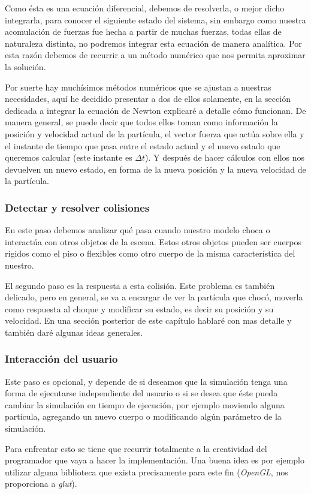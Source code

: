 Como ésta es una ecuación diferencial, debemos de resolverla, o mejor dicho integrarla, para conocer el siguiente estado del sistema, sin embargo como nuestra acomulación de fuerzas fue hecha a partir de muchas fuerzas, todas ellas de naturaleza distinta, no podremos integrar esta ecuación de manera analítica. Por esta razón debemos de recurrir a un método numérico que nos permita aproximar la solución.

Por suerte hay muchísimos métodos numéricos que se ajustan a nuestras necesidades, aquí he decidido presentar a dos de ellos solamente, en la sección dedicada a integrar la ecuación de Newton explicaré a detalle cómo funcionan. De manera general, se puede decir que todos ellos toman como información la posición y velocidad actual de la partícula, el vector fuerza que actúa sobre ella y el instante de tiempo que pasa entre el estado actual y el nuevo estado que queremos calcular (este instante es $\Delta t$). Y después de hacer cálculos con ellos nos devuelven un nuevo estado, en forma de la nueva posición y la nueva velocidad de la partícula.

\subsubsection{Detectar y resolver colisiones}
En este paso debemos analizar qué pasa cuando nuestro modelo choca o interactúa con otros objetos de la escena. Estos otros objetos pueden ser cuerpos rígidos como el piso o flexibles como otro cuerpo de la misma característica del nuestro.

El segundo paso es la respuesta a esta colisión. Este problema es también delicado, pero en general, se va a encargar de ver la partícula que chocó, moverla como respuesta al choque y modificar su estado, es decir su posición y su velocidad. En una sección posterior de este capítulo hablaré con mas detalle y también daré algunas ideas generales.

\subsubsection{Interacción del usuario}
Este paso es opcional, y depende de si deseamos que la simulación tenga una forma de ejecutarse independiente del usuario o si se desea que éste pueda cambiar la simulación en tiempo de ejecución, por ejemplo moviendo alguna partícula, agregando un nuevo cuerpo o modificando algún parámetro de la simulación.

Para enfrentar esto se tiene que recurrir totalmente a la creatividad del programador que vaya a hacer la implementación. Una buena idea es por ejemplo utilizar alguna biblioteca que exista precisamente para este fin (\emph{\foreignlanguage{english}{OpenGL}}, nos proporciona a \emph{\foreignlanguage{english}{glut}}).

